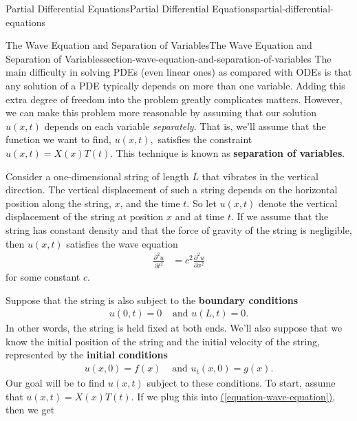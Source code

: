 \documentclass[oneside,10pt,]{book}
\newcommand{\terminology}[1]{\textbf{#1}}
\numberwithin{equation}{section}
\newcommand{\amp}{&}
\begin{document}
\begin{chapterptx}{Partial Differential Equations}{}{Partial Differential Equations}{}{}{partial-differential-equations}
\typeout{************************************************}
%
\begin{sectionptx}{The Wave Equation and Separation of Variables}{}{The Wave Equation and Separation of Variables}{}{}{section-wave-equation-and-separation-of-variables}
\hypertarget{p-649}{}%
The main difficulty in solving PDEs (even linear ones) as compared with ODEs is that any solution of a PDE typically depends on more than one variable. Adding this extra degree of freedom into the problem greatly complicates matters. However, we can make this problem more reasonable by assuming that our solution \(u(x,t)\) depends on each variable \emph{separately}. That is, we'll assume that the function we want to find, \(u(x,t),\) satisfies the constraint \(u(x,t) = X(x)T(t)\). This technique is known as \terminology{separation of variables}.%
\par
\hypertarget{p-650}{}%
Consider a one-dimensional string of length \(L\) that vibrates in the vertical direction. The vertical displacement of such a string depends on the horizontal position along the string, \(x\), and the time \(t\). So let \(u(x,t)\) denote the vertical displacement of the string at position \(x\) and at time \(t\). If we assume that the string has constant density and that the force of gravity of the string is negligible, then \(u(x,t)\) satisfies the wave equation%
\begin{align}
\frac{\partial^{2}u}{\partial t^{2}} \amp = c^{2}\frac{\partial^{2}u}{\partial x^{2}} \label{equation-wave-equation}
\end{align}
for some constant \(c\).%
\par
\hypertarget{p-651}{}%
Suppose that the string is also subject to the \terminology{boundary conditions}%
%
\begin{align}
u(0,t) = 0 \amp\text{ and } u(L,t) = 0\text{.}\label{equation-boundary-conditions}
\end{align}
\hypertarget{p-652}{}%
In other words, the string is held fixed at both ends. We'll also suppose that we know the initial position of the string and the initial velocity of the string, represented by the \terminology{initial conditions}%
%
\begin{align}
u(x,0) = f(x) \amp \text{ and } u_{t}(x,0) = g(x) \text{.}\label{equation-initial-condition}
\end{align}
\hypertarget{p-653}{}%
Our goal will be to find \(u(x,t)\) subject to these conditions. To start, assume that \(u(x,t) = X(x)T(t).\) If we plug this into \hyperref[equation-wave-equation]{(\ref{equation-wave-equation})}, then we get%

\end{sectionptx}
\end{chapterptx}
\end{document}
